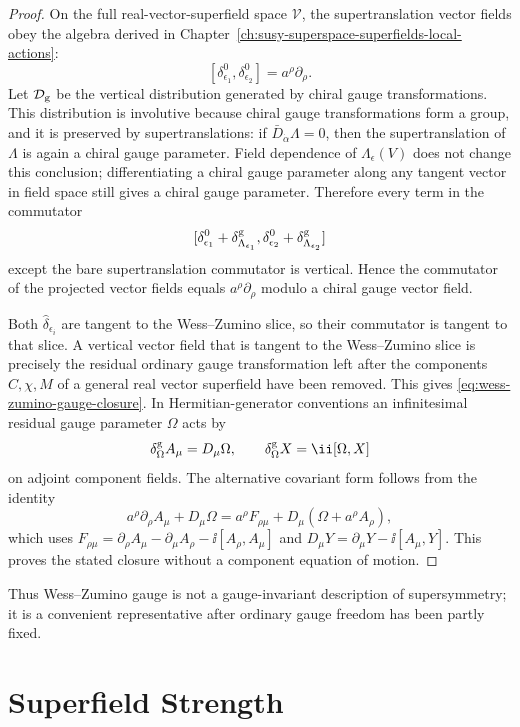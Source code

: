 \begin{proof}
On the full real-vector-superfield space \(\mathcal V\), the
supertranslation vector fields obey the algebra derived in
Chapter~\ref{ch:susy-superspace-superfields-local-actions}:
\[
  [\delta^0_{\epsilon_1},\delta^0_{\epsilon_2}]
  =
  a^\rho\partial_\rho .
\]
Let \(\mathcal D_{\rm g}\) be the vertical distribution generated by chiral
gauge transformations.  This distribution is involutive because chiral gauge
transformations form a group, and it is preserved by supertranslations:
if \(\bar D_{\dot\alpha}\Lambda=0\), then the supertranslation of
\(\Lambda\) is again a chiral gauge parameter.  Field dependence of
\(\Lambda_\epsilon(V)\) does not change this conclusion; differentiating a
chiral gauge parameter along any tangent vector in field space still gives a
chiral gauge parameter.  Therefore every term in the commutator
\[
  [\delta^0_{\epsilon_1}+\delta^{\rm g}_{\Lambda_{\epsilon_1}},
    \delta^0_{\epsilon_2}+\delta^{\rm g}_{\Lambda_{\epsilon_2}}]
\]
except the bare supertranslation commutator is vertical.  Hence the
commutator of the projected vector fields equals \(a^\rho\partial_\rho\)
modulo a chiral gauge vector field.

Both \(\widehat\delta_{\epsilon_i}\) are tangent to the Wess--Zumino slice,
so their commutator is tangent to that slice.  A vertical vector field that
is tangent to the Wess--Zumino slice is precisely the residual ordinary
gauge transformation left after the components \(C,\chi,M\) of a general
real vector superfield have been removed.  This gives
\eqref{eq:wess-zumino-gauge-closure}.  In Hermitian-generator conventions an
infinitesimal residual gauge parameter \(\Omega\) acts by
\[
  \delta^{\rm g}_\Omega A_\mu=D_\mu\Omega,
  \qquad
  \delta^{\rm g}_\Omega X=\ii[\Omega,X]
\]
on adjoint component fields.  The alternative covariant form follows from
the identity
\[
  a^\rho\partial_\rho A_\mu+D_\mu\Omega
  =
  a^\rho F_{\rho\mu}+D_\mu(\Omega+a^\rho A_\rho),
\]
which uses
\(F_{\rho\mu}=\partial_\rho A_\mu-\partial_\mu A_\rho
-\ii[A_\rho,A_\mu]\) and
\(D_\mu Y=\partial_\mu Y-\ii[A_\mu,Y]\).  This proves the stated closure
without a component equation of motion.
\end{proof}

Thus Wess--Zumino gauge is not a gauge-invariant description of
supersymmetry; it is a convenient representative after ordinary gauge
freedom has been partly fixed.

\section{Superfield Strength}

